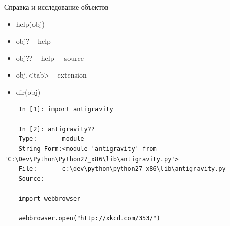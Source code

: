 \documentclass{article}
\begin{document}
\newpage

\begin{center} Справка и исследование объектов \end{center}
\begin{itemize}
    \item help(obj)
    \item obj?    -- help
    \item obj??   -- help + source
    \item obj.<tab>  -- extension
    \item dir(obj)
\end{itemize}

\begin{lstlisting}
    In [1]: import antigravity

    In [2]: antigravity??
    Type:       module
    String Form:<module 'antigravity' from 'C:\Dev\Python\Python27_x86\lib\antigravity.py'>
    File:       c:\dev\python\python27_x86\lib\antigravity.py
    Source:

    import webbrowser

    webbrowser.open("http://xkcd.com/353/")
\end{lstlisting}
\newpage

\end{document}

